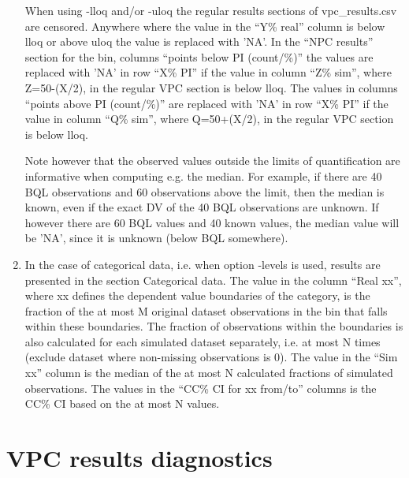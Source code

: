 \begin{enumerate}
When using -lloq and/or -uloq the 
regular results sections of vpc\_results.csv are censored.
Anywhere where the value in the “Y\% real” column is below lloq or above uloq the value is replaced with 'NA'. In the “NPC results” section for the bin, columns “points below PI (count/\%)” the values are replaced with 'NA' in row “X\% PI” if the value in column “Z\% sim”, where Z=50-(X/2), in the regular VPC section is below lloq. The values in columns “points above PI (count/\%)” are replaced with 'NA' in row “X\% PI” if the value in column “Q\% sim”, where Q=50+(X/2), in the regular VPC section is below lloq.

Note however that the observed values outside the
limits of quantification are informative when computing e.g. the median.
For example, if there are 40 BQL observations 
and 60 observations above the limit,
then the median is known, even if the exact DV of the
40 BQL observations are unknown. If however there are 60 BQL values and
40 known values, the median value will be 'NA',
since it is unknown (below BQL somewhere).

	\item In the case of categorical data, i.e. when option -levels is used, results are presented in the section Categorical data. The value in the column “Real xx”, where xx defines the dependent value boundaries of the category, is the fraction of the at most M original dataset observations in the bin that falls within these boundaries. The fraction of observations within the boundaries is also calculated for each simulated dataset separately, i.e. at most N times (exclude dataset where non-missing observations is 0). The value in the “Sim xx” column is the median of the at most N calculated fractions of simulated observations. The values in the “CC\% CI for xx from/to” columns is the CC\% CI based on the at most N values.
\end{enumerate}

\section{VPC results diagnostics}

